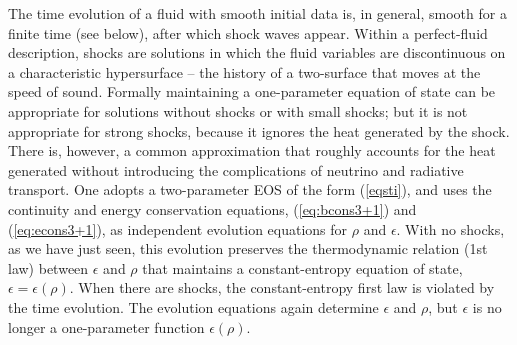 \documentclass[12pt]{article}
\begin{document}
{The time evolution of a fluid with smooth initial data is, in general, 
smooth for a finite time (see below), after which shock waves appear.
Within a perfect-fluid description, shocks are solutions in which the 
fluid variables are discontinuous on a characteristic hypersurface -- 
the history of a two-surface that moves at the speed of sound.     
Formally maintaining a one-parameter equation of state can be appropriate for 
solutions without shocks or with small shocks; but it is not appropriate 
for strong shocks, because it ignores the heat generated by the shock.  
There is, however, a common approximation that roughly accounts for the heat 
generated without introducing the complications of neutrino and radiative 
transport.  One adopts a two-parameter EOS of the form (\ref{eqsti}), and 
uses the continuity and energy conservation equations, (\ref{eq:bcons3+1}) and 
(\ref{eq:econs3+1}), as independent evolution equations for $\rho$ and $\epsilon$.  
With no shocks, as we have just seen, this evolution preserves the thermodynamic 
relation (1st law) between $\epsilon$ and $\rho$ that maintains a constant-entropy 
equation of state, 
$\epsilon = \epsilon(\rho)$.  
When there are shocks,
the constant-entropy first law is violated by the time evolution. The evolution 
equations again determine $\epsilon$ and $\rho$, but $\epsilon$ is
 no longer a one-parameter function $\epsilon(\rho)$.  
 
}
\end{document}

